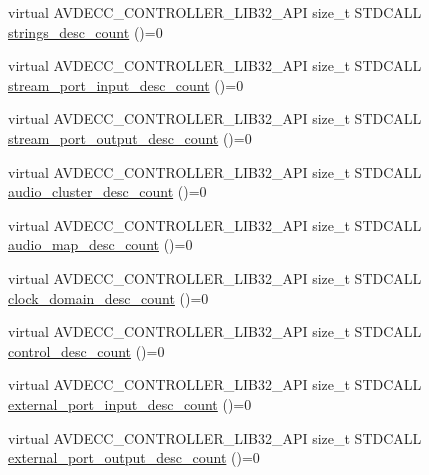 \begin{DoxyCompactItemize}
\item 
virtual A\+V\+D\+E\+C\+C\+\_\+\+C\+O\+N\+T\+R\+O\+L\+L\+E\+R\+\_\+\+L\+I\+B32\+\_\+\+A\+PI size\+\_\+t S\+T\+D\+C\+A\+LL \hyperlink{classavdecc__lib_1_1configuration__descriptor_a15e2737b1998af8123e888697dc62859}{strings\+\_\+desc\+\_\+count} ()=0
\item 
virtual A\+V\+D\+E\+C\+C\+\_\+\+C\+O\+N\+T\+R\+O\+L\+L\+E\+R\+\_\+\+L\+I\+B32\+\_\+\+A\+PI size\+\_\+t S\+T\+D\+C\+A\+LL \hyperlink{classavdecc__lib_1_1configuration__descriptor_a836e1a36ce664bca990de217b53d36b3}{stream\+\_\+port\+\_\+input\+\_\+desc\+\_\+count} ()=0
\item 
virtual A\+V\+D\+E\+C\+C\+\_\+\+C\+O\+N\+T\+R\+O\+L\+L\+E\+R\+\_\+\+L\+I\+B32\+\_\+\+A\+PI size\+\_\+t S\+T\+D\+C\+A\+LL \hyperlink{classavdecc__lib_1_1configuration__descriptor_a58cdf6527f31108945befa42ef682f2b}{stream\+\_\+port\+\_\+output\+\_\+desc\+\_\+count} ()=0
\item 
virtual A\+V\+D\+E\+C\+C\+\_\+\+C\+O\+N\+T\+R\+O\+L\+L\+E\+R\+\_\+\+L\+I\+B32\+\_\+\+A\+PI size\+\_\+t S\+T\+D\+C\+A\+LL \hyperlink{classavdecc__lib_1_1configuration__descriptor_a4fb6d1822e990aca2ea3993effbea267}{audio\+\_\+cluster\+\_\+desc\+\_\+count} ()=0
\item 
virtual A\+V\+D\+E\+C\+C\+\_\+\+C\+O\+N\+T\+R\+O\+L\+L\+E\+R\+\_\+\+L\+I\+B32\+\_\+\+A\+PI size\+\_\+t S\+T\+D\+C\+A\+LL \hyperlink{classavdecc__lib_1_1configuration__descriptor_a591e29d13b318216c95007e92e05ff8f}{audio\+\_\+map\+\_\+desc\+\_\+count} ()=0
\item 
virtual A\+V\+D\+E\+C\+C\+\_\+\+C\+O\+N\+T\+R\+O\+L\+L\+E\+R\+\_\+\+L\+I\+B32\+\_\+\+A\+PI size\+\_\+t S\+T\+D\+C\+A\+LL \hyperlink{classavdecc__lib_1_1configuration__descriptor_aaf707ea8fc30234388930ff17456f610}{clock\+\_\+domain\+\_\+desc\+\_\+count} ()=0
\item 
virtual A\+V\+D\+E\+C\+C\+\_\+\+C\+O\+N\+T\+R\+O\+L\+L\+E\+R\+\_\+\+L\+I\+B32\+\_\+\+A\+PI size\+\_\+t S\+T\+D\+C\+A\+LL \hyperlink{classavdecc__lib_1_1configuration__descriptor_adb8ec7a53baa84c4bcdca47cab26f177}{control\+\_\+desc\+\_\+count} ()=0
\item 
virtual A\+V\+D\+E\+C\+C\+\_\+\+C\+O\+N\+T\+R\+O\+L\+L\+E\+R\+\_\+\+L\+I\+B32\+\_\+\+A\+PI size\+\_\+t S\+T\+D\+C\+A\+LL \hyperlink{classavdecc__lib_1_1configuration__descriptor_a88158805661b69b56051916e25de58cc}{external\+\_\+port\+\_\+input\+\_\+desc\+\_\+count} ()=0
\item 
virtual A\+V\+D\+E\+C\+C\+\_\+\+C\+O\+N\+T\+R\+O\+L\+L\+E\+R\+\_\+\+L\+I\+B32\+\_\+\+A\+PI size\+\_\+t S\+T\+D\+C\+A\+LL \hyperlink{classavdecc__lib_1_1configuration__descriptor_aca2a0ab2856be16f3e928c5441f69df8}{external\+\_\+port\+\_\+output\+\_\+desc\+\_\+count} ()=0

\end{DoxyCompactItemize}
